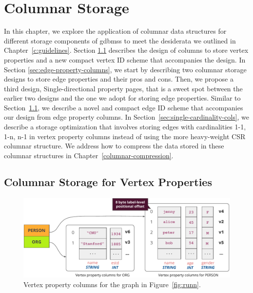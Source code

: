 \chapter{Columnar Storage}
\label{c:columnar-storage}

In this chapter, we explore the application of columnar data structures for different storage components of  \gls{gdbms}s to meet the desiderata we outlined in Chapter~\ref{c:guidelines}. Section \ref{sec:vertex-property-columns} describes the design of columns to store vertex properties and a new compact vertex ID scheme that accompanies the design. In Section \ref{sec:edge-property-columns}, we start by describing two columnar storage designs to store edge properties and their pros and cons. Then, we propose a third design, Single-directional property pages, that is a sweet spot between the earlier two designs and the one we adopt for storing edge properties. Similar to Section~\ref{sec:vertex-property-columns}, we describe a novel and compact edge ID scheme that accompanies our design from edge property columns. In Section~\ref{sec:single-cardinality-cols}, we describe a storage optimization that involves storing edges with cardinalities 1-1, 1-n, n-1 in vertex property columns instead of using the more heavy-weight CSR columnar structure. We address how to compress the data stored in these columnar structures in Chapter~\ref{columnar-compression}.

\section{Columnar Storage for Vertex Properties}
\label{sec:vertex-property-columns}

\begin{figure}
	\hfill\includegraphics[scale=0.85]{img/vpcols}\hspace*{\fill}
	\caption{Vertex property columns for the graph in Figure~\ref{fig:runn}.}
	\label{fig:vpcols}
\end{figure}

